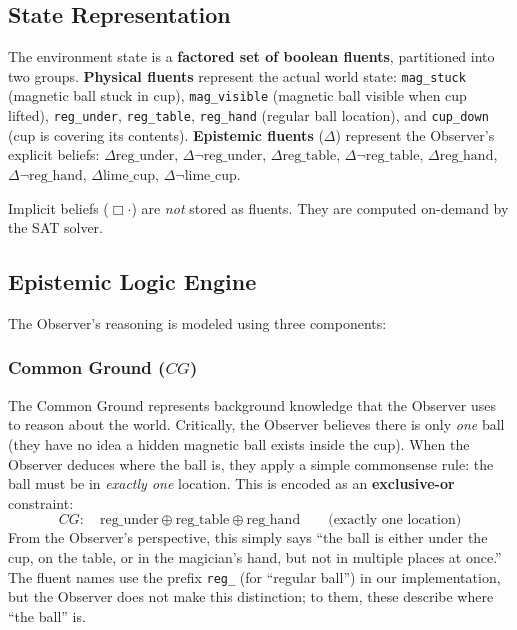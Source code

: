 \documentclass[11pt]{article}
\newcommand{\EBel}[1]{\ensuremath{\Delta #1}} %
\newcommand{\IBel}[1]{\ensuremath{\Box #1}}   %
\newcommand{\CG}{\ensuremath{\mathit{CG}}}    %
\begin{document}
\subsection{State Representation}

The environment state is a \textbf{factored set of boolean fluents}, partitioned into two groups.
\textbf{Physical fluents} represent the actual world state: \texttt{mag\_stuck} (magnetic ball stuck in cup), \texttt{mag\_visible} (magnetic ball visible when cup lifted), \texttt{reg\_under}, \texttt{reg\_table}, \texttt{reg\_hand} (regular ball location), and \texttt{cup\_down} (cup is covering its contents).
\textbf{Epistemic fluents} ($\Delta$) represent the Observer's explicit beliefs: $\EBel{\text{reg\_under}}$, $\EBel{\neg\text{reg\_under}}$, $\EBel{\text{reg\_table}}$, $\EBel{\neg\text{reg\_table}}$, $\EBel{\text{reg\_hand}}$, $\EBel{\neg\text{reg\_hand}}$, $\EBel{\text{lime\_cup}}$, $\EBel{\neg\text{lime\_cup}}$.

Implicit beliefs ($\IBel{\cdot}$) are \emph{not} stored as fluents. They are computed on-demand by the SAT solver.

\subsection{Epistemic Logic Engine}

The Observer's reasoning is modeled using three components:

\subsubsection{Common Ground ($\CG$)}
The Common Ground represents background knowledge that the Observer uses to reason about the world. Critically, the Observer believes there is only \emph{one} ball (they have no idea a hidden magnetic ball exists inside the cup). When the Observer deduces where the ball is, they apply a simple commonsense rule: the ball must be in \emph{exactly one} location. This is encoded as an \textbf{exclusive-or} constraint:
\[
    \CG: \quad \text{reg\_under} \oplus \text{reg\_table} \oplus \text{reg\_hand}
    \qquad \text{(exactly one location)}
\]
From the Observer's perspective, this simply says ``the ball is either under the cup, on the table, or in the magician's hand, but not in multiple places at once.'' The fluent names use the prefix \texttt{reg\_} (for ``regular ball'') in our implementation, but the Observer does not make this distinction; to them, these describe where ``the ball'' is.
\end{document}
